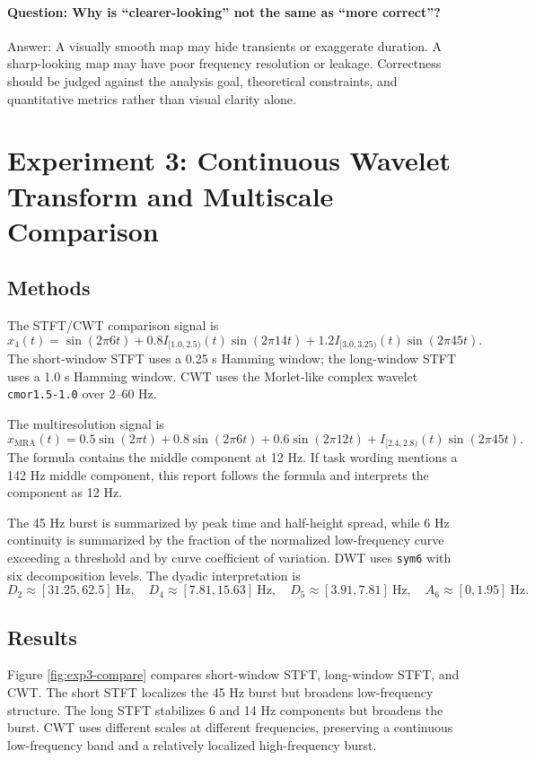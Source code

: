 \documentclass[a4paper,11pt]{article}
\numberwithin{equation}{section}
\begin{document}
\paragraph{Question: Why is ``clearer-looking'' not the same as ``more correct''?}
Answer: A visually smooth map may hide transients or exaggerate duration. A sharp-looking map may have poor frequency resolution or leakage. Correctness should be judged against the analysis goal, theoretical constraints, and quantitative metrics rather than visual clarity alone.

\FloatBarrier
\clearpage
\section{Experiment 3: Continuous Wavelet Transform and Multiscale Comparison}
\subsection{Methods}
The STFT/CWT comparison signal is
\begin{equation}
x_4(t)=\sin(2\pi 6t)+0.8I_{[1.0,2.5)}(t)\sin(2\pi 14t)+1.2I_{[3.0,3.25)}(t)\sin(2\pi 45t).
\end{equation}
The short-window STFT uses a 0.25 s Hamming window; the long-window STFT uses a 1.0 s Hamming window. CWT uses the Morlet-like complex wavelet \texttt{cmor1.5-1.0} over 2--60 Hz.

The multiresolution signal is
\begin{equation}
x_\mathrm{MRA}(t)=0.5\sin(2\pi t)+0.8\sin(2\pi 6t)+0.6\sin(2\pi 12t)+I_{[2.4,2.8)}(t)\sin(2\pi 45t).
\end{equation}
The formula contains the middle component at 12 Hz. If task wording mentions a 142 Hz middle component, this report follows the formula and interprets the component as 12 Hz.

The 45 Hz burst is summarized by peak time and half-height spread, while 6 Hz continuity is summarized by the fraction of the normalized low-frequency curve exceeding a threshold and by curve coefficient of variation. DWT uses \texttt{sym6} with six decomposition levels. The dyadic interpretation is
\begin{equation}
D_2\approx[31.25,62.5]\ \mathrm{Hz},\quad
D_4\approx[7.81,15.63]\ \mathrm{Hz},\quad
D_5\approx[3.91,7.81]\ \mathrm{Hz},\quad
A_6\approx[0,1.95]\ \mathrm{Hz}.
\end{equation}

\Needspace{0.72\textheight}
\subsection{Results}
Figure \ref{fig:exp3-compare} compares short-window STFT, long-window STFT, and CWT. The short STFT localizes the 45 Hz burst but broadens low-frequency structure. The long STFT stabilizes 6 and 14 Hz components but broadens the burst. CWT uses different scales at different frequencies, preserving a continuous low-frequency band and a relatively localized high-frequency burst.
\end{document}
